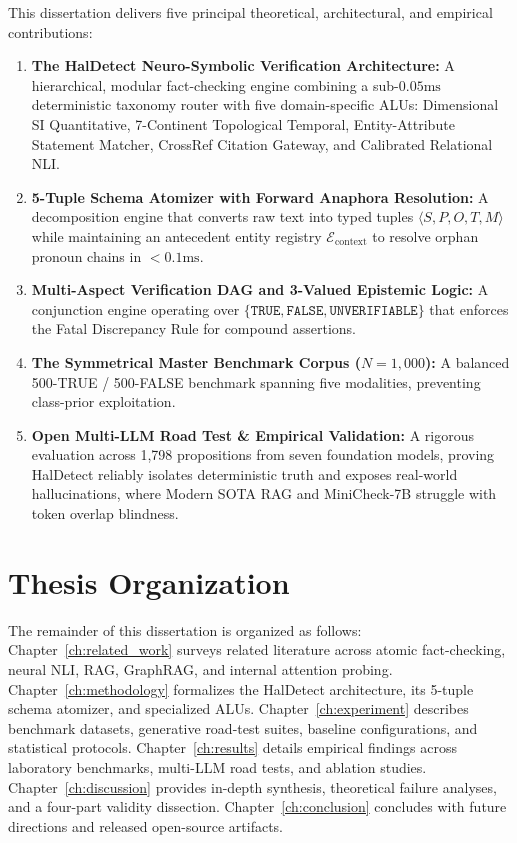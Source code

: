 This dissertation delivers five principal theoretical, architectural, and empirical contributions:
\begin{enumerate}
    \item \textbf{The HalDetect Neuro-Symbolic Verification Architecture:} A hierarchical, modular fact-checking engine combining a sub-$0.05\text{ms}$ deterministic taxonomy router with five domain-specific ALUs: Dimensional SI Quantitative, 7-Continent Topological Temporal, Entity-Attribute Statement Matcher, CrossRef Citation Gateway, and Calibrated Relational NLI.
    \item \textbf{5-Tuple Schema Atomizer with Forward Anaphora Resolution:} A decomposition engine that converts raw text into typed tuples $\langle S, P, O, T, M \rangle$ while maintaining an antecedent entity registry $\mathcal{E}_{\text{context}}$ to resolve orphan pronoun chains in $< 0.1\text{ms}$.
    \item \textbf{Multi-Aspect Verification DAG and 3-Valued Epistemic Logic:} A conjunction engine operating over $\{\texttt{TRUE}, \texttt{FALSE}, \texttt{UNVERIFIABLE}\}$ that enforces the Fatal Discrepancy Rule for compound assertions.
    \item \textbf{The Symmetrical Master Benchmark Corpus ($N = 1,000$):} A balanced 500-TRUE / 500-FALSE benchmark spanning five modalities, preventing class-prior exploitation.
    \item \textbf{Open Multi-LLM Road Test \& Empirical Validation:} A rigorous evaluation across 1,798 propositions from seven foundation models, proving HalDetect reliably isolates deterministic truth and exposes real-world hallucinations, where Modern SOTA RAG and MiniCheck-7B struggle with token overlap blindness.
\end{enumerate}

\section{Thesis Organization}
\label{sec:thesis_org}

The remainder of this dissertation is organized as follows: Chapter~\ref{ch:related_work} surveys related literature across atomic fact-checking, neural NLI, RAG, GraphRAG, and internal attention probing. Chapter~\ref{ch:methodology} formalizes the HalDetect architecture, its 5-tuple schema atomizer, and specialized ALUs. Chapter~\ref{ch:experiment} describes benchmark datasets, generative road-test suites, baseline configurations, and statistical protocols. Chapter~\ref{ch:results} details empirical findings across laboratory benchmarks, multi-LLM road tests, and ablation studies. Chapter~\ref{ch:discussion} provides in-depth synthesis, theoretical failure analyses, and a four-part validity dissection. Chapter~\ref{ch:conclusion} concludes with future directions and released open-source artifacts.
